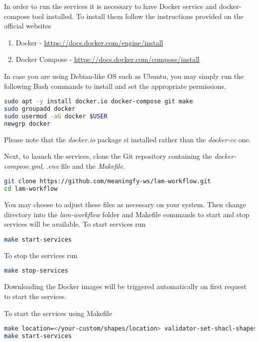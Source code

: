 In order to run the services it is necessary to have Docker \citep{docker} service and docker-compose tool installed. To install them follow the instructions provided on the official websites

\begin{enumerate}
	\item Docker - \url{https://docs.docker.com/engine/install}
	\item Docker Compose - \url{https://docs.docker.com/compose/install}
\end{enumerate}

In case you are using Debian-like OS such as Ubuntu, you may simply run the following Bash commands to install and set the appropriate permissions.

\begin{lstlisting}[language=bash,]
sudo apt -y install docker.io docker-compose git make
sudo groupadd docker
sudo usermod -aG docker $USER
newgrp docker
\end{lstlisting}

Please note that the \textit{docker.io} package si installed rather than the \textit{docker-ce} one.

Next, to launch the services, clone the Git repository containing the \textit{docker-compose.yml}, \textit{.env} file and the \textit{Makefile}. 

\begin{lstlisting}[language=bash,]
git clone https://github.com/meaningfy-ws/lam-workflow.git
cd lam-workflow
\end{lstlisting}

You may choose to adjust these files as necessary on your system. Then change directory into the \textit{lam-workflow} folder and Makefile commands to start and stop services will be available. To start services run

\begin{lstlisting}[language=bash,]
make start-services
\end{lstlisting}

To stop the services run 

\begin{lstlisting}[language=bash,]
make stop-services
\end{lstlisting}

Downloading the Docker images will be triggered automatically on first request to start the services.

To start the services using Makefile

\begin{lstlisting}[language=bash,]
make location=</your-custom/shapes/location> validator-set-shacl-shapes
make start-services
\end{lstlisting}

